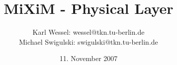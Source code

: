 \documentclass[10pt, a4paper]{article}
\begin{document}
\title{MiXiM - Physical Layer}
\author{Karl Wessel: wessel$@$tkn.tu-berlin.de\\
Michael Swigulski: swigulski$@$tkn.tu-berlin.de}
\date{11. November 2007}
\maketitle
%

%

\newcommand{\h}[1]{\textit{#1}}
\newcommand{\bp}{BasePhyLayer}
\newcommand{\bm}{BaseMacLayer}







%
\end{document}
